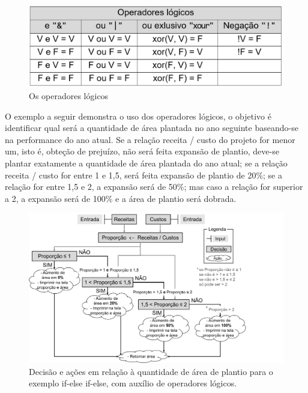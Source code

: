 \documentclass[
  11pt,
  a5paper,
  openany]{book}
\begin{document}
\begin{figure}

{\centering \includegraphics[width=1\linewidth]{images/Fig_Cond6} 

}

\caption{Os operadores lógicos}\label{fig:FigCond6}
\end{figure}

O exemplo a seguir demonstra o uso dos operadores lógicos, o objetivo é identificar qual será a quantidade de área plantada no ano seguinte baseando-se na performance do ano atual. Se a relação receita / custo do projeto for menor um, isto é, obteção de prejuízo, não será feita expansão de plantio, deve-se plantar exatamente a quantidade de área plantada do ano atual; se a relação receita / custo for entre 1 e 1,5, será feita expansão de plantio de 20\%; se a relação for entre 1,5 e 2, a expansão será de 50\%; mas caso a relação for superior a 2, a expansão será de 100\% e a área de plantio será dobrada.

\begin{figure}

{\centering \includegraphics[width=1\linewidth]{images/Fig_Cond7} 

}

\caption{Decisão e ações em relação à quantidade de área de plantio para o exemplo if-else if-else, com auxílio de operadores lógicos.}\label{fig:FigCond7}
\end{figure}
\end{document}
